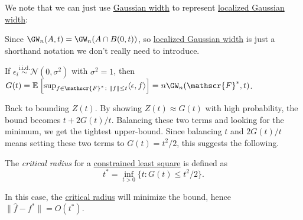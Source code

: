 We note that we can just use \hyperref[def:Gaussian-width]{Gaussian width} to represent \hyperref[def:localized-Gaussian-width]{localized Gaussian width}:

\begin{remark}\label{rmk:GW}
	Since \(\GW_n (A, t) = \GW_n (A \cap B(0, t))\), so \hyperref[def:localized-Gaussian-width]{localized Gaussian width} is just a shorthand notation we don't really need to introduce.
\end{remark}

\begin{note}
	If \(\epsilon _i \overset{\text{i.i.d.} }{\sim } \mathcal{N} (0, \sigma ^2)\) with \(\sigma ^2 = 1\), then \(G(t) = \mathbb{E}_{}\left[ \sup _{f\in \mathscr{F} ^{\ast} \colon \lVert f \rVert \leq t} \langle \epsilon , f \rangle \right] = n \GW_n(\mathscr{F} ^{\ast} , t)\).
\end{note}

Back to bounding \(Z(t)\). By showing \(Z(t) \approx G(t)\) with high probability, the bound becomes \(t + 2 G(t) / t\). Balancing these two terms and looking for the minimum, we get the tightest upper-bound. Since balancing \(t\) and \(2G(t) / t\) means setting these two terms to \(G(t) = t^2 / 2\), this suggests the following.

\begin{definition}\label{def:critical-radius}
	The \emph{critical radius} for a \hyperref[prb:constrained-LS]{constrained least square} is defined as
	\[
		t^{\ast} = \inf _{t > 0} \{ t \colon G(t) \leq t^2 / 2 \} .
	\]
\end{definition}

In this case, the \hyperref[def:critical-radius]{critical radius} will minimize the bound, hence \(\lVert \hat{f} - f^{\ast} \rVert = O(t^{\ast} )\).